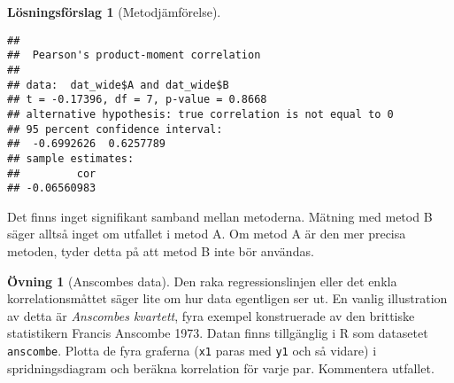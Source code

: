 \documentclass[
]{book}
\theoremstyle{definition}
\theoremstyle{definition}
\theoremstyle{definition}
\newtheorem{exercise}{Övning}[chapter]
\theoremstyle{definition}
\newtheorem{hypothesis}{Lösningsförslag}[chapter]
\theoremstyle{remark}
\begin{document}
\begin{hypothesis}[Metodjämförelse]
\begin{verbatim}
## 
##  Pearson's product-moment correlation
## 
## data:  dat_wide$A and dat_wide$B
## t = -0.17396, df = 7, p-value = 0.8668
## alternative hypothesis: true correlation is not equal to 0
## 95 percent confidence interval:
##  -0.6992626  0.6257789
## sample estimates:
##         cor 
## -0.06560983
\end{verbatim}

Det finns inget signifikant samband mellan metoderna. Mätning med metod B säger alltså inget om utfallet i metod A. Om metod A är den mer precisa metoden, tyder detta på att metod B inte bör användas.
\end{hypothesis}

\begin{exercise}[Anscombes data]
Den raka regressionslinjen eller det enkla korrelationsmåttet säger lite om hur data egentligen ser ut. En vanlig illustration av detta är \emph{Anscombes kvartett}, fyra exempel konstruerade av den brittiske statistikern Francis Anscombe 1973. Datan finns tillgänglig i R som datasetet \texttt{anscombe}. Plotta de fyra graferna (\texttt{x1} paras med \texttt{y1} och så vidare) i spridningsdiagram och beräkna korrelation för varje par. Kommentera utfallet.
\end{exercise}
\end{document}
